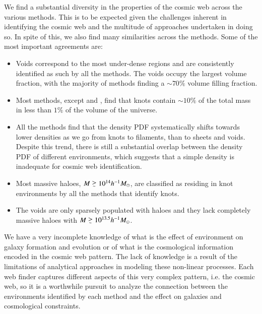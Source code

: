 We find a substantial diversity in the properties of the cosmic web across the various methods. This is to be expected given the challenges inherent in identifying the cosmic web and the multitude of approaches undertaken in doing so. In spite of this, we also find many similarities across the methods. Some of the most important agreements are:
\begin{itemize}
	\item Voids correspond to the most under-dense regions and are consistently identified as such by all the methods. The voids occupy the largest volume fraction, with the majority of methods finding a ${\sim}70\%$ volume filling fraction.
	\item Most methods, except \origami{} and \tweb{}, find that knots contain ${\sim}10\%$ of the total mass in less than $1\%$ of the volume of the universe.
	\item All the methods find that the density PDF systematically shifts towards lower densities as we go from knots to filaments, than to sheets and voids. Despite this trend, there is still a substantial overlap between the density PDF of different environments, which suggests that a simple density is inadequate for cosmic web identification. 
	\item Most massive haloes, $M\gsim10^{14}h^{-1}M_{\odot}$, are classified as residing in knot environments by all the methods that identify knots.
	\item The voids are only sparsely populated with haloes and they lack completely massive haloes with $M\gsim10^{13.5}h^{-1}M_{\odot}$.
\end{itemize}

We have a very incomplete knowledge of what is the effect of environment on galaxy formation and evolution or of what is the cosmological information encoded in the cosmic web pattern. The lack of knowledge is a result of the limitations of analytical approaches in modeling these non-linear processes. Each web finder captures different aspects of this very complex pattern, i.e. the cosmic web, so     it is a worthwhile pursuit to analyze the connection between the environments identified by each method and the effect on galaxies and cosmological constraints.



